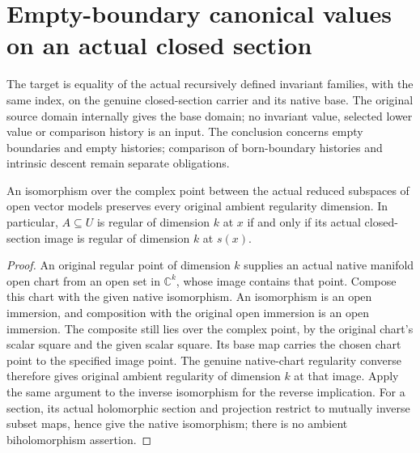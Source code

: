 \section{Empty-boundary canonical values on an actual closed section}
The target is equality of the actual recursively defined invariant families,
with the same index, on the genuine closed-section carrier and its native base.
The original source domain internally gives the base domain; no invariant
value, selected lower value or comparison history is an input. The conclusion concerns empty boundaries and empty histories; comparison of born-boundary histories and intrinsic descent remain separate obligations.

\begin{lemma}
\label{hir:actual-section-regularity-native-iso}
\leanok
An isomorphism over the complex point between the actual reduced subspaces
of open vector models preserves every original ambient regularity dimension.
In particular, $A\subseteq U$ is regular of dimension $k$ at $x$ if and only
if its actual closed-section image is regular of dimension $k$ at $s(x)$.
\end{lemma}
\begin{proof}
An original regular point of dimension $k$ supplies an actual native manifold
open chart from an open set in $\mathbb C^k$, whose image contains that point.
Compose this chart with the given native isomorphism. An isomorphism is an
open immersion, and composition with the original open immersion is an open
immersion. The composite still lies over the complex point, by the original
chart's scalar square and the given scalar square. Its base map carries the
chosen chart point to the specified image point. The genuine native-chart
regularity converse therefore gives original ambient regularity of dimension
$k$ at that image. Apply the same argument to the inverse isomorphism for the
reverse implication. For a section, its actual holomorphic section and projection
restrict to mutually inverse subset maps, hence give the native isomorphism;
there is no ambient biholomorphism assertion.
\end{proof}

